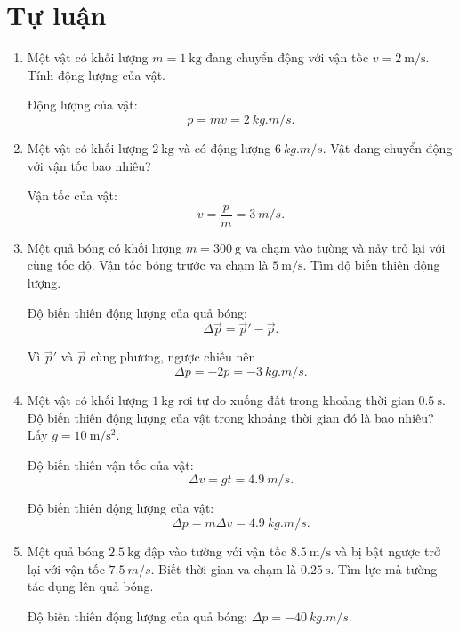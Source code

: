 \section{Tự luận}
\begin{enumerate}[label=\bfseries Câu \arabic*:]
	
	\item {}
	
	
	{
		Một vật có khối lượng $m=\SI{1}{\kilogram}$ đang chuyển động với vận tốc $v=\SI{2}{\meter/\second}$. Tính động lượng của vật.
	}
	
	\hideall
	{	
		Động lượng của vật: $$p=mv=\SI{2}{kg.m/s}.$$
	}
	\item {}
	
	
	{
		Một vật có khối lượng $\SI{2}{\kilogram}$ và có động lượng $\SI{6}{kg.m/s}$. Vật đang chuyển động với vận tốc bao nhiêu?
	}
	
	\hideall
	{	
		Vận tốc của vật: $$v=\dfrac{p}{m}=\SI{3}{m/s}.$$
	}
	\item {}
	
	
	{
		Một quả bóng có khối lượng $m=\SI{300}{\gram}$ va chạm vào tường và nảy trở lại với cùng tốc độ. Vận tốc bóng trước va chạm là $\SI{5}{\meter/\second}$. Tìm độ biến thiên động lượng.
	}
	
	\hideall
	{	
			Độ biến thiên động lượng của quả bóng:
		$$\Delta \vec p  = \vec p' - \vec p.$$
		
		Vì $\vec p'$ và $\vec p$ cùng phương, ngược chiều nên $$\Delta p = -2p = \SI{-3}{kg.m/s}.$$
	}
	\item {}
	
	
	{
		Một vật có khối lượng $\SI{1}{\kilogram}$ rơi tự do xuống đất trong khoảng thời gian $\SI{0,5}{\second}$. Độ biến thiên động lượng của vật trong khoảng thời gian đó là bao nhiêu? Lấy $g=\SI{10}{\meter/\second^2}$.
	}
	
	\hideall
	{	
		Độ biến thiên vận tốc của vật:
		$$\Delta v = gt = \SI{4.9}{m/s}.$$
		
		Độ biến thiên động lượng của vật: $$\Delta p = m\Delta v = \SI{4.9}{kg.m/s}.$$
	}
	\item {}
	
	
	{
		Một quả bóng $\SI{2.5}{\kilogram}$ đập vào tường với vận tốc $\SI{8.5}{\meter/\second}$ và bị bật ngược trở lại với vận tốc $\SI{7.5}{m/s}$. Biết thời gian va chạm là $\SI{0.25}{\second}$. Tìm lực mà tường tác dụng lên quả bóng.
	}
	
	\hideall
	{	
		Độ biến thiên động lượng của quả bóng:
		$\Delta p = \SI{-40}{kg.m/s}$.
		
}
\end{enumerate}
